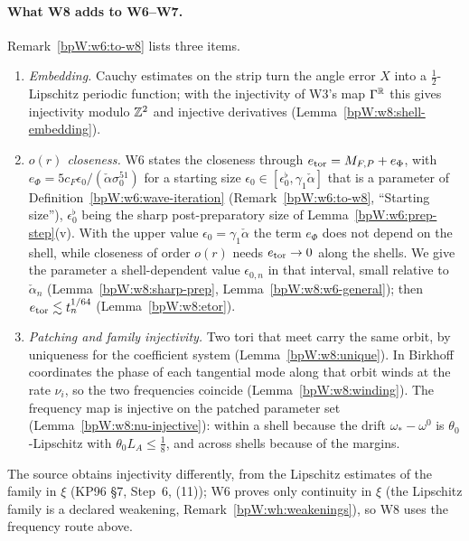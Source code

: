 \paragraph{What W8 adds to W6--W7.} Remark~\ref{bpW:w6:to-w8} lists three items.
\begin{enumerate}[label=(\arabic*)]
\item \emph{Embedding.} Cauchy estimates on the strip turn the angle error $X$ into a $\frac12$-Lipschitz periodic
  function; with the injectivity of W3's map $\Gamma^{\mathbb{R}}$ this gives injectivity modulo $\mathbb{Z}^2$ and injective derivatives
  (Lemma~\ref{bpW:w8:shell-embedding}).
\item \emph{$o(r)$ closeness.} W6 states the closeness through $e_{\rm tor}=M_{F,P}+e_\Phi$, with
  $e_\Phi=5c_F\epsilon_0/(\check\alpha\sigma_0^{51})$ for a starting size $\epsilon_0\in[\epsilon^\flat_0,\gamma_1\check\alpha]$ that is a
  parameter of Definition~\ref{bpW:w6:wave-iteration} (Remark~\ref{bpW:w6:to-w8}, ``Starting size''), $\epsilon^\flat_0$ being the sharp
  post-preparatory size of Lemma~\ref{bpW:w6:prep-step}(v). With the upper value $\epsilon_0=\gamma_1\check\alpha$ the term $e_\Phi$ does
  not depend on the shell, while closeness of order $o(r)$ needs $e_{\rm tor}\to0$ along the shells. We give the parameter a
  shell-dependent value $\epsilon_{0,n}$ in that interval, small relative to $\check\alpha_n$ (Lemma~\ref{bpW:w8:sharp-prep},
  Lemma~\ref{bpW:w8:w6-general}); then $e_{\rm tor}\lesssim t_n^{1/64}$ (Lemma~\ref{bpW:w8:etor}).
\item \emph{Patching and family injectivity.} Two tori that meet carry the same orbit, by uniqueness for the
  coefficient system (Lemma~\ref{bpW:w8:unique}). In Birkhoff coordinates the phase of each tangential mode along that
  orbit winds at the rate $\nu_i$, so the two frequencies coincide (Lemma~\ref{bpW:w8:winding}). The frequency map is
  injective on the patched parameter set (Lemma~\ref{bpW:w8:nu-injective}): within a shell because the drift
  $\omega_*-\omega^0$ is $\theta_0$-Lipschitz with $\theta_0L_A\le\frac18$, and across shells because of the
  margins.
\end{enumerate}
The source obtains injectivity differently, from the Lipschitz estimates of the family in $\xi$ (KP96 \S7,
Step~6, (11)); W6 proves only continuity in $\xi$ (the Lipschitz family is a declared weakening,
Remark~\ref{bpW:wh:weakenings}), so W8 uses the frequency route above.

